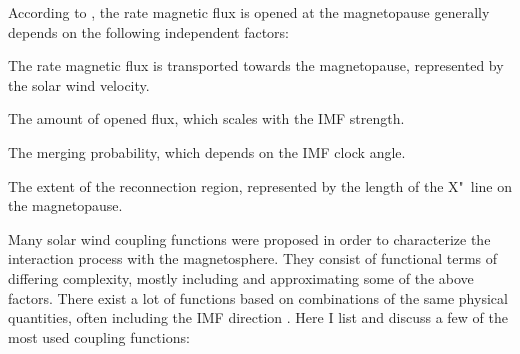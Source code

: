 According to \citet{Newell2007}, the rate magnetic flux is opened at the magnetopause generally depends on the following independent factors:
\begin{itemize*}
	\item The rate magnetic flux is transported towards the magnetopause, represented by the solar wind velocity.
	\item The amount of opened flux, which scales with the IMF strength.
	\item The merging probability, which depends on the IMF clock angle.
	\item The extent of the reconnection region, represented by the length of the X"~line on the magnetopause.
\end{itemize*}
Many solar wind coupling functions were proposed in order to characterize the interaction process with the magnetosphere. They consist of functional terms of differing complexity, mostly including and approximating some of the above factors. There exist a lot of functions based on combinations of the same physical quantities, often including the IMF direction \citep{Newell2007,Lockwood2013}. Here I list and discuss a few of the most used coupling functions:
